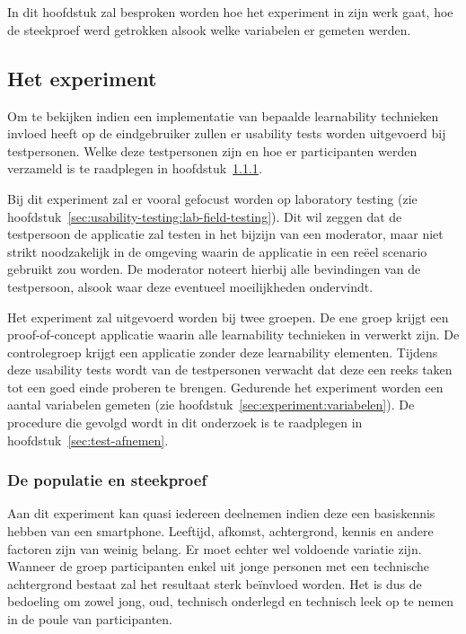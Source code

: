 \chapter{}
\label{ch:methodologie}

In dit hoofdstuk zal besproken worden hoe het experiment in zijn werk gaat, hoe de steekproef werd getrokken alsook welke variabelen er gemeten werden.

\section{Het experiment}
\label{sec:experiment}

Om te bekijken indien een implementatie van bepaalde learnability technieken invloed heeft op de eindgebruiker zullen er usability tests worden uitgevoerd bij testpersonen. Welke deze testpersonen zijn en hoe er participanten werden verzameld is te raadplegen in hoofdstuk~\ref{sec:experiment:populatie-steekproef}.

Bij dit experiment zal er vooral gefocust worden op laboratory testing (zie hoofdstuk~\ref{sec:usability-testing:lab-field-testing}). Dit wil zeggen dat de testpersoon de applicatie zal testen in het bijzijn van een moderator, maar niet strikt noodzakelijk in de omgeving waarin de applicatie in een reëel scenario gebruikt zou worden. De moderator noteert hierbij alle bevindingen van de testpersoon, alsook waar deze eventueel moeilijkheden ondervindt.

Het experiment zal uitgevoerd worden bij twee groepen. De ene groep krijgt een proof-of-concept applicatie waarin alle learnability technieken in verwerkt zijn. De controlegroep krijgt een applicatie zonder deze learnability elementen. Tijdens deze usability tests wordt van de testpersonen verwacht dat deze een reeks taken tot een goed einde proberen te brengen. Gedurende het experiment worden een aantal variabelen gemeten (zie hoofdstuk~\ref{sec:experiment:variabelen}). De procedure die gevolgd wordt in dit onderzoek is te raadplegen in hoofdstuk~\ref{sec:test-afnemen}.

\subsection{De populatie en steekproef}
\label{sec:experiment:populatie-steekproef}

Aan dit experiment kan quasi iedereen deelnemen indien deze een basiskennis hebben van een smartphone. Leeftijd, afkomst, achtergrond, kennis en andere factoren zijn van weinig belang. Er moet echter wel voldoende variatie zijn. Wanneer de groep participanten enkel uit jonge personen met een technische achtergrond bestaat zal het resultaat sterk beïnvloed worden. Het is dus de bedoeling om zowel jong, oud, technisch onderlegd en technisch leek op te nemen in de poule van participanten.


